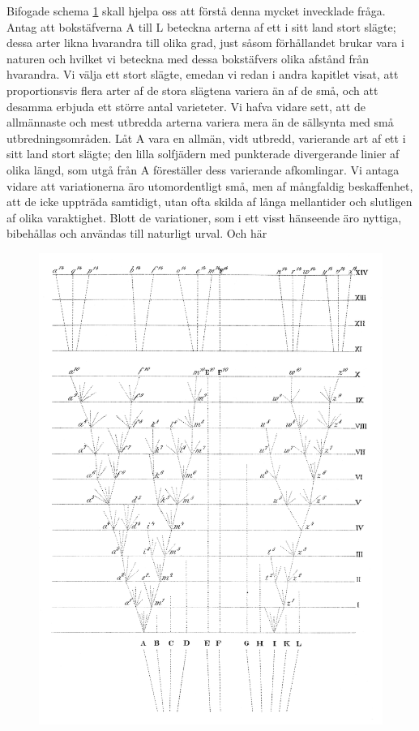 Bifogade schema \ref{fig:inverkan} skall hjelpa oss att förstå denna mycket invecklade fråga. Antag att bokstäfverna A till L beteckna arterna af ett i sitt land stort slägte; dessa arter likna hvarandra till olika grad, just såsom förhållandet brukar vara i naturen och hvilket vi beteckna med dessa bokstäfvers olika afstånd från hvarandra. Vi välja ett stort slägte, emedan vi redan i andra kapitlet visat, att proportionsvis flera arter af de stora slägtena variera än af de små, och att desamma erbjuda ett större antal varieteter. Vi hafva vidare sett, att de allmännaste och mest utbredda arterna variera mera än de sällsynta med små utbredningsområden. Låt A vara en allmän, vidt utbredd, varierande art af ett i sitt land stort slägte; den lilla solfjädern med punkterade divergerande linier af olika längd, som utgå från A föreställer dess varierande afkomlingar. Vi antaga vidare att variationerna äro utomordentligt små, men af mångfaldig beskaffenhet, att de icke uppträda samtidigt, utan ofta skilda af långa mellantider och slutligen af olika varaktighet. Blott de variationer, som i ett visst hänseende äro nyttiga, bibehållas och användas till naturligt urval. Och här

\begin{figure}
\includegraphics{bilder/plansch_1}
\caption{\label{fig:inverkan}}
\end{figure}

